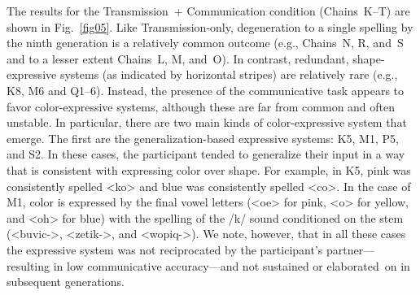 \documentclass[doc,biblatex]{apa7}
\begin{document}
The results for the Transmission~+ Communication condition (Chains~K--T) are shown in Fig.~\ref{fig05}. Like Transmission-only, degeneration to a single spelling by the ninth generation is a relatively common outcome (e.g., Chains~N, R, and~S and to a lesser extent Chains~L, M, and~O). In contrast, redundant, shape-expressive systems (as indicated by horizontal stripes) are relatively rare (e.g., K8, M6 and Q1--6). Instead, the presence of the communicative task appears to favor color-expressive systems, although these are far from common and often unstable. In particular, there are two main kinds of color-expressive system that emerge. The first are the generalization-based expressive systems: K5, M1, P5, and S2. In these cases, the participant tended to generalize their input in a way that is consistent with expressing color over shape. For example, in K5, pink was consistently spelled <ko> and blue was consistently spelled <co>. In the case of M1, color is expressed by the final vowel letters (<oe> for pink, <o> for yellow, and <oh> for blue) with the spelling of the /k/ sound conditioned on the stem (<buvic->, <zetik->, and <wopiq->). We note, however, that in all these cases the expressive system was not reciprocated by the participant's partner---resulting in low communicative accuracy---and not sustained or elaborated~on in subsequent generations.
\end{document}
